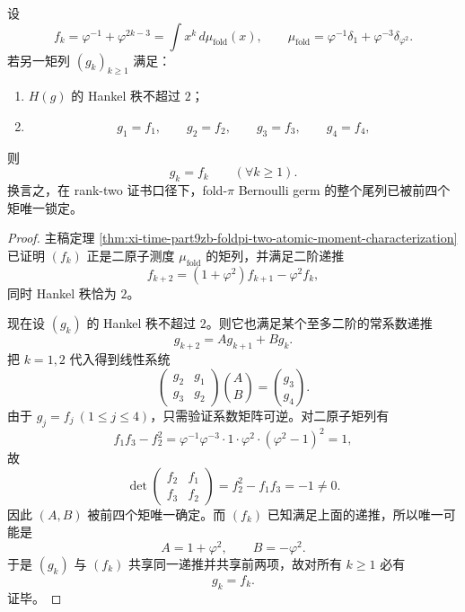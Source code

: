 \begin{theorem}\label{thm:conclusion-foldpi-ranktwo-four-moment-rigidity}
设
\[
f_k=\varphi^{-1}+\varphi^{2k-3}
=\int x^k\,d\mu_{\mathrm{fold}}(x),
\qquad
\mu_{\mathrm{fold}}=\varphi^{-1}\delta_1+\varphi^{-3}\delta_{\varphi^2}.
\]
若另一矩列 \((g_k)_{k\ge 1}\) 满足：
\begin{enumerate}
  \item \(H(g)\) 的 Hankel 秩不超过 \(2\)；
  \item
  \[
  g_1=f_1,\qquad g_2=f_2,\qquad g_3=f_3,\qquad g_4=f_4,
  \]
\end{enumerate}
则
\[
g_k=f_k\qquad(\forall k\ge 1).
\]
换言之，在 rank-two 证书口径下，fold-\(\pi\) Bernoulli germ 的整个尾列已被前四个矩唯一锁定。
\end{theorem}
\begin{proof}
主稿定理 \ref{thm:xi-time-part9zb-foldpi-two-atomic-moment-characterization} 已证明 \((f_k)\) 正是二原子测度 \(\mu_{\mathrm{fold}}\) 的矩列，并满足二阶递推
\[
f_{k+2}=(1+\varphi^2)f_{k+1}-\varphi^2 f_k,
\]
同时 Hankel 秩恰为 \(2\)。

现在设 \((g_k)\) 的 Hankel 秩不超过 \(2\)。则它也满足某个至多二阶的常系数递推
\[
g_{k+2}=A g_{k+1}+B g_k.
\]
把 \(k=1,2\) 代入得到线性系统
\[
\begin{pmatrix}
g_2 & g_1\\
g_3 & g_2
\end{pmatrix}
\binom{A}{B}
=
\binom{g_3}{g_4}.
\]
由于 \(g_j=f_j\ (1\le j\le 4)\)，只需验证系数矩阵可逆。对二原子矩列有
\[
f_1f_3-f_2^2
=
\varphi^{-1}\varphi^{-3}\cdot 1\cdot \varphi^2\cdot(\varphi^2-1)^2
=1,
\]
故
\[
\det
\begin{pmatrix}
f_2 & f_1\\
f_3 & f_2
\end{pmatrix}
=
f_2^2-f_1f_3=-1\neq 0.
\]
因此 \((A,B)\) 被前四个矩唯一确定。而 \((f_k)\) 已知满足上面的递推，所以唯一可能是
\[
A=1+\varphi^2,\qquad B=-\varphi^2.
\]
于是 \((g_k)\) 与 \((f_k)\) 共享同一递推并共享前两项，故对所有 \(k\ge 1\) 必有
\[
g_k=f_k.
\]
证毕。
\end{proof}

